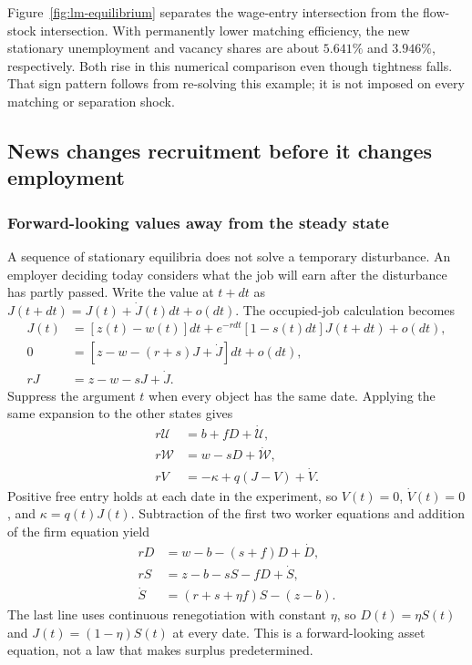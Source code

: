 Figure~\ref{fig:lm-equilibrium} separates the wage-entry intersection from the
flow-stock intersection. With permanently lower matching efficiency, the
new stationary unemployment and vacancy shares are about $5.641\%$ and
$3.946\%$, respectively. Both rise in this numerical comparison even though
tightness falls. That sign pattern follows from re-solving this example;
it is not imposed on every matching or separation shock.

\subsection{News changes recruitment before it changes employment}

\subsubsection{Forward-looking values away from the steady state}

A sequence of stationary equilibria does not solve a temporary disturbance.
An employer deciding today considers what the job will earn after the
disturbance has partly passed. Write the value at $t+dt$ as
$J(t+dt)=J(t)+\dot J(t)dt+o(dt)$. The occupied-job calculation becomes
\begin{align}
 J(t)&=[z(t)-w(t)]dt+e^{-rdt}[1-s(t)dt]J(t+dt)+o(dt),\\
 0&=[z-w-(r+s)J+\dot J]dt+o(dt),\\
 rJ&=z-w-sJ+\dot J.
 \label{eq:lm-dynamic-J}
\end{align}
Suppress the argument $t$ when every object has the same date. Applying the
same expansion to the other states gives
\begin{align}
 r\mathcal U&=b+fD+\dot{\mathcal U},\\
 r\mathcal W&=w-sD+\dot{\mathcal W},\\
 rV&=-\kappa+q(J-V)+\dot V.
\end{align}
Positive free entry holds at each date in the experiment, so $V(t)=0$,
$\dot V(t)=0$, and $\kappa=q(t)J(t)$. Subtraction of the first two worker
equations and addition of the firm equation yield
\begin{align}
 rD&=w-b-(s+f)D+\dot D,\\
 rS&=z-b-sS-fD+\dot S,\\
 \dot S&=(r+s+\eta f)S-(z-b).
 \label{eq:lm-dynamic-surplus}
\end{align}
The last line uses continuous renegotiation with constant $\eta$, so
$D(t)=\eta S(t)$ and $J(t)=(1-\eta)S(t)$ at every date. This is a
forward-looking asset equation, not a law that makes surplus predetermined.

